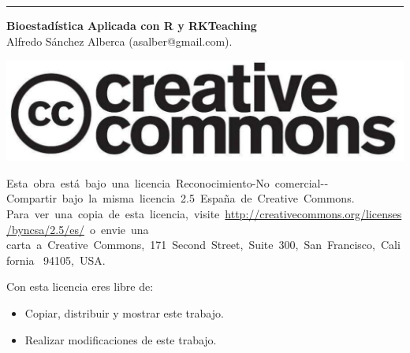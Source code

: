 \begin{titlepage}
\null
\vfill
\hrule depth 3pt
\smallskip
\sffamily

\noindent \textbf{Bioestadística Aplicada con R y RKTeaching}\\
Alfredo Sánchez Alberca (asalber@gmail.com).

\bigskip
\begin{center}
\includegraphics[scale=0.1]{img/cc-logo}
\end{center}

\medskip
\small
Esta obra está bajo una licencia Reconocimiento­-No comercial-­Compartir bajo la misma licencia 2.5 España de Creative Commons. 
Para ver una copia de esta licencia, visite \url{http://creativecommons.org/licenses/by­nc­sa/2.5/es/} o envie una  
carta a Creative Commons, 171 Second Street, Suite 300, San Francisco, California  94105, USA.

\medskip
Con esta licencia eres libre de:
\begin{itemize}
\item Copiar, distribuir y mostrar este trabajo.
\item Realizar modificaciones de este trabajo.
\end{itemize}


\end{titlepage}
